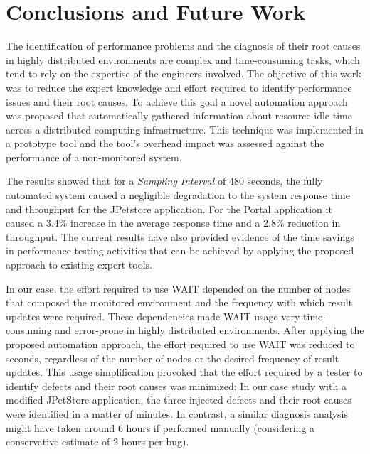 \documentclass[runningheads,a4paper]{llncs}
\begin{document}
\vspace{-5pt}
\section{Conclusions and Future Work}
\label{Conclusions}
\vspace{-5pt}

The identification of performance problems and the diagnosis of their root
causes in highly distributed environments are complex and time-consuming tasks,
which tend to rely on the expertise of the engineers involved. The objective of
this work was to reduce the expert knowledge and effort required to identify
performance issues and their root causes. To achieve this goal a novel automation 
approach was proposed that automatically gathered information about resource
idle time across a distributed computing infrastructure. This technique was
implemented in a prototype tool and the tool’s overhead impact was assessed
against the performance of a non-monitored system. 

The results showed that for a \emph{Sampling Interval} of 480 seconds, the
fully automated system caused a negligible degradation to the system response
time and throughput for the JPetstore application. For the Portal application it
caused a 3.4\% increase in the average response time and a 2.8\% reduction in
throughput. The current results have also provided evidence of the time savings
in performance testing activities that can be achieved by applying the proposed
approach to existing expert tools. 

In our case, the effort required to use WAIT depended on the number of nodes
that composed the monitored environment and the frequency with which
result updates were required. These dependencies made WAIT usage very
time-consuming and error-prone in highly distributed environments. After
applying the proposed automation approach, the effort required to use WAIT was
reduced to seconds, regardless of the number of nodes or the desired frequency
of result updates. This usage simplification provoked that the effort required
by a tester to identify defects and their root causes was minimized: In our case
study with a modified JPetStore application, the three injected defects and their root causes
were identified in a matter of minutes. In contrast, a similar diagnosis
analysis might have taken around 6 hours if performed manually (considering a
conservative estimate of 2 hours per bug).
\end{document}

